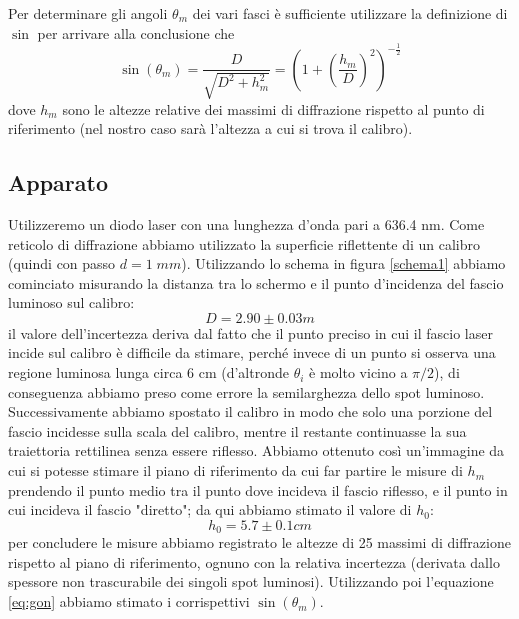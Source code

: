 \documentclass[10pt, a4paper, italian]{article}
\begin{document}
Per determinare gli angoli $\theta _m$ dei vari fasci è sufficiente utilizzare la definizione di $\sin$ per arrivare alla conclusione che
\begin{equation}
\sin(\theta _m)=\frac{D}{\sqrt{D^2 + h_m^2}}=(1+ (\frac{h_m}{D})^2)^{-\frac{1}{2}}
\label{eq:gon}
\end{equation}
dove $h_m$ sono le altezze relative dei massimi di diffrazione rispetto al punto di riferimento (nel nostro caso sarà l'altezza a cui si trova il calibro).
\subsection{Apparato}
Utilizzeremo un diodo laser con una lunghezza d'onda pari a 636.4 nm.
Come reticolo di diffrazione abbiamo utilizzato la superficie riflettente di un calibro (quindi con passo $d=1 \; mm$).
Utilizzando lo schema in figura \ref{schema1} abbiamo cominciato misurando la distanza tra lo schermo e il punto d'incidenza del fascio luminoso sul calibro:
\[
D=2.90 \pm 0.03 m
\]
il valore dell'incertezza deriva dal fatto che il punto preciso in cui il fascio laser incide sul calibro è difficile da stimare, perché invece di un punto si osserva una regione luminosa lunga circa 6 cm (d'altronde $\theta _i$ è molto vicino a $\pi /2$), di conseguenza abbiamo preso come errore la semilarghezza dello spot luminoso.
Successivamente abbiamo spostato il calibro in modo che solo una porzione del fascio incidesse sulla scala del calibro, mentre il restante continuasse la sua traiettoria rettilinea senza essere riflesso.
Abbiamo ottenuto così un'immagine da cui si potesse stimare il piano di riferimento da cui far partire le misure di $h_m$ prendendo il punto medio tra il punto dove incideva il fascio riflesso, e il punto in cui incideva il fascio "diretto"; da qui abbiamo stimato il valore di $h_0$:
\[
h_0=5.7 \pm 0.1 cm
\]
per concludere le misure abbiamo registrato le altezze di 25 massimi di diffrazione rispetto al piano di riferimento, ognuno con la relativa incertezza (derivata dallo spessore non trascurabile dei singoli spot luminosi).
Utilizzando poi l'equazione \ref{eq:gon} abbiamo stimato i corrispettivi $\sin(\theta _m)$.
\end{document}
